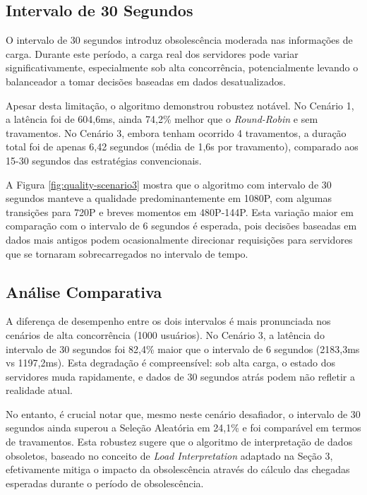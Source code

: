 \subsection{Intervalo de 30 Segundos}

O intervalo de 30 segundos introduz obsolescência moderada nas informações de carga. Durante este período, a carga real dos servidores pode variar significativamente, especialmente sob alta concorrência, potencialmente levando o balanceador a tomar decisões baseadas em dados desatualizados.

Apesar desta limitação, o algoritmo demonstrou robustez notável. No Cenário 1, a latência foi de 604,6ms, ainda 74,2\% melhor que o \textit{Round-Robin} e sem travamentos. No Cenário 3, embora tenham ocorrido 4 travamentos, a duração total foi de apenas 6,42 segundos (média de 1,6s por travamento), comparado aos 15-30 segundos das estratégias convencionais.

A Figura \ref{fig:quality-scenario3} mostra que o algoritmo com intervalo de 30 segundos manteve a qualidade predominantemente em 1080P, com algumas transições para 720P e breves momentos em 480P-144P. Esta variação maior em comparação com o intervalo de 6 segundos é esperada, pois decisões baseadas em dados mais antigos podem ocasionalmente direcionar requisições para servidores que se tornaram sobrecarregados no intervalo de tempo.

\subsection{Análise Comparativa}

A diferença de desempenho entre os dois intervalos é mais pronunciada nos cenários de alta concorrência (1000 usuários). No Cenário 3, a latência do intervalo de 30 segundos foi 82,4\% maior que o intervalo de 6 segundos (2183,3ms vs 1197,2ms). Esta degradação é compreensível: sob alta carga, o estado dos servidores muda rapidamente, e dados de 30 segundos atrás podem não refletir a realidade atual.

No entanto, é crucial notar que, mesmo neste cenário desafiador, o intervalo de 30 segundos ainda superou a Seleção Aleatória em 24,1\% e foi comparável em termos de travamentos. Esta robustez sugere que o algoritmo de interpretação de dados obsoletos, baseado no conceito de \textit{Load Interpretation} adaptado na Seção 3, efetivamente mitiga o impacto da obsolescência através do cálculo das chegadas esperadas durante o período de obsolescência.

